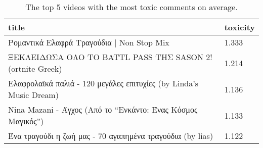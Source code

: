 \begin{table}
\caption{The top 5 videos with the most toxic comments on average.}
\label{tab::toxic_videos}
\begin{tabular}{|p{10cm}|p{1cm}|}
\toprule
title & toxicity \\
\midrule
Ρομαντικά Ελαφρά Τραγούδια | Non Stop Mix & 1.333 \\
ΞΕΚΛΕΙΔΩΣΑ ΟΛΟ ΤΟ BATTL PASS ΤΗΣ SASON 2! (ortnite Greek) & 1.214 \\
Ελαφρολαϊκά παλιά - 120 μεγάλες επιτυχίες (by Linda's Music Dream) & 1.136 \\
Nina Mazani - Άγχος (Από το “Ενκάντο: Ένας Κόσμος Μαγικός”) & 1.133 \\
Ένα τραγούδι η ζωή μας - 70 αγαπημένα τραγούδια (by lias) & 1.122 \\
\bottomrule
\end{tabular}
\end{table}
